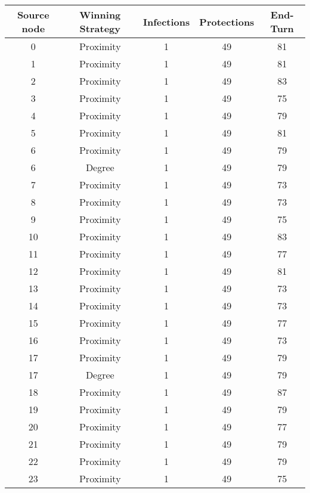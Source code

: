 \documentclass[results.tex]{subfiles}
\begin{document}
\begin{center}
  \begin{tabular}{| c || c | c | c | c |}
    \hline
    {\bfseries Source node} & {\bfseries Winning Strategy} & {\bfseries Infections} & {\bfseries Protections} & {\bfseries End-Turn} \\  %
    \hline\hline
    0 & Proximity & 1 & 49 & 81 \\ 
    \hline
    1 & Proximity & 1 & 49 & 81 \\ 
    \hline
    2 & Proximity & 1 & 49 & 83 \\ 
    \hline
    3 & Proximity & 1 & 49 & 75 \\ 
    \hline
    4 & Proximity & 1 & 49 & 79 \\ 
    \hline
    5 & Proximity & 1 & 49 & 81 \\ 
    \hline
    6 & Proximity & 1 & 49 & 79 \\ 
    \hline
    6 & Degree & 1 & 49 & 79 \\ 
    \hline
    7 & Proximity & 1 & 49 & 73 \\ 
    \hline
    8 & Proximity & 1 & 49 & 73 \\ 
    \hline
    9 & Proximity & 1 & 49 & 75 \\ 
    \hline
    10 & Proximity & 1 & 49 & 83 \\ 
    \hline
    11 & Proximity & 1 & 49 & 77 \\ 
    \hline
    12 & Proximity & 1 & 49 & 81 \\ 
    \hline
    13 & Proximity & 1 & 49 & 73 \\ 
    \hline
    14 & Proximity & 1 & 49 & 73 \\ 
    \hline
    15 & Proximity & 1 & 49 & 77 \\ 
    \hline
    16 & Proximity & 1 & 49 & 73 \\ 
    \hline
    17 & Proximity & 1 & 49 & 79 \\ 
    \hline
    17 & Degree & 1 & 49 & 79 \\ 
    \hline
    18 & Proximity & 1 & 49 & 87 \\ 
    \hline
    19 & Proximity & 1 & 49 & 79 \\ 
    \hline
    20 & Proximity & 1 & 49 & 77 \\ 
    \hline
    21 & Proximity & 1 & 49 & 79 \\ 
    \hline
    22 & Proximity & 1 & 49 & 79 \\ 
    \hline
    23 & Proximity & 1 & 49 & 75 \\ 

\end{tabular}
\end{center}
\end{document}
